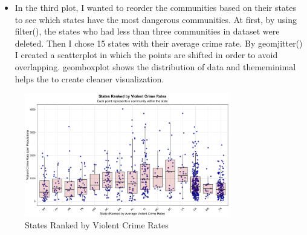 \documentclass{article}
\begin{document}
\begin{itemize}
    \item In the third plot, I wanted to reorder the communities based on their states to see which states have the most dangerous communities. At first, by using filter(), the states who had less than three communities in dataset were deleted. Then I chose 15 states with their average crime rate. By geomjitter() I created a scatterplot in which the points are shifted in order to avoid overlapping. geomboxplot shows the distribution of data and thememinimal helps the to create cleaner visualization.  
\end{itemize}

\begin{figure}[H]
    \centering
    \includegraphics[width=0.8\textwidth]{PS6c_Karbalaei.png}
    \caption{States Ranked by Violent Crime Rates}
    \label{fig:states}
\end{figure}
\end{document}
